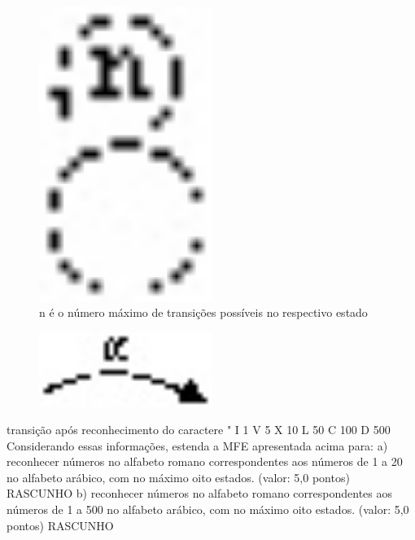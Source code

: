 \documentclass{exam}
\begin{document}
\begin{questions}
\begin{figure}[H]
	\begin{center}
		\includegraphics[width=0.5\textwidth]{CIENCIA_DA_COMPUTACAO_Prova2005-utf8_figuras/fig-0038.jpg}
		\caption{n é o número máximo de transições possíveis no respectivo estado}
	\end{center}
\end{figure}

\begin{figure}[H]
	\begin{center}
		\includegraphics[width=0.5\textwidth]{CIENCIA_DA_COMPUTACAO_Prova2005-utf8_figuras/fig-0039.jpg}
	\end{center}
\end{figure}
transição após reconhecimento do caractere "
I 1
V 5
X 10
L 50
C 100
D 500
Considerando essas informações, estenda a MFE apresentada acima para:
a) reconhecer números no alfabeto romano correspondentes aos números de 1 a 20 no alfabeto arábico, com no máximo oito estados.
(valor: 5,0 pontos)
RASCUNHO
b) reconhecer números no alfabeto romano correspondentes aos números de 1 a 500 no alfabeto arábico, com no máximo oito
estados. (valor: 5,0 pontos)
RASCUNHO


\end{questions}
\end{document}
